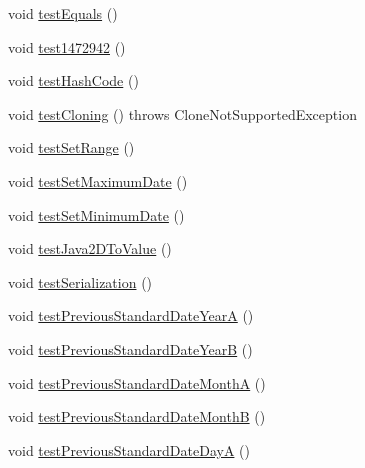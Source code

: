 \begin{DoxyCompactItemize}
\item 
void \mbox{\hyperlink{classorg_1_1jfree_1_1chart_1_1axis_1_1_date_axis_test_a646d71fff77e2baec100705a3c99d370}{test\+Equals}} ()
\item 
void \mbox{\hyperlink{classorg_1_1jfree_1_1chart_1_1axis_1_1_date_axis_test_a4c3f12266deb3fce553b02aae0ea0687}{test1472942}} ()
\item 
void \mbox{\hyperlink{classorg_1_1jfree_1_1chart_1_1axis_1_1_date_axis_test_a3e9c94c892e319797c9319c40d959970}{test\+Hash\+Code}} ()
\item 
void \mbox{\hyperlink{classorg_1_1jfree_1_1chart_1_1axis_1_1_date_axis_test_ac4c81f43851a88e0fb8f7851c2759cf0}{test\+Cloning}} ()  throws Clone\+Not\+Supported\+Exception 
\item 
void \mbox{\hyperlink{classorg_1_1jfree_1_1chart_1_1axis_1_1_date_axis_test_a62d9a4e5bd6a008f1ff6a2f00e72532b}{test\+Set\+Range}} ()
\item 
void \mbox{\hyperlink{classorg_1_1jfree_1_1chart_1_1axis_1_1_date_axis_test_a2744370aa6bd8a5b08b9355245dd906a}{test\+Set\+Maximum\+Date}} ()
\item 
void \mbox{\hyperlink{classorg_1_1jfree_1_1chart_1_1axis_1_1_date_axis_test_a8871d83651eb85689766f15f9abbcbf7}{test\+Set\+Minimum\+Date}} ()
\item 
void \mbox{\hyperlink{classorg_1_1jfree_1_1chart_1_1axis_1_1_date_axis_test_ae5c8f356bbcb348203edc50e057fc229}{test\+Java2\+D\+To\+Value}} ()
\item 
void \mbox{\hyperlink{classorg_1_1jfree_1_1chart_1_1axis_1_1_date_axis_test_a7bb490e6fc9238ae69c5113067a95dc8}{test\+Serialization}} ()
\item 
void \mbox{\hyperlink{classorg_1_1jfree_1_1chart_1_1axis_1_1_date_axis_test_ad063c586f485b72b2c13200df592af60}{test\+Previous\+Standard\+Date\+YearA}} ()
\item 
void \mbox{\hyperlink{classorg_1_1jfree_1_1chart_1_1axis_1_1_date_axis_test_a4a7b7602cc586b3b0f1850a8c750c220}{test\+Previous\+Standard\+Date\+YearB}} ()
\item 
void \mbox{\hyperlink{classorg_1_1jfree_1_1chart_1_1axis_1_1_date_axis_test_aba9835ab269201f2e1b77cbef85ff3d3}{test\+Previous\+Standard\+Date\+MonthA}} ()
\item 
void \mbox{\hyperlink{classorg_1_1jfree_1_1chart_1_1axis_1_1_date_axis_test_a6ebe1b079f47acb7719837b8a66b92c4}{test\+Previous\+Standard\+Date\+MonthB}} ()
\item 
void \mbox{\hyperlink{classorg_1_1jfree_1_1chart_1_1axis_1_1_date_axis_test_a0a5d74b1a65726ba8aefbd4ea787eaad}{test\+Previous\+Standard\+Date\+DayA}} ()

\end{DoxyCompactItemize}
